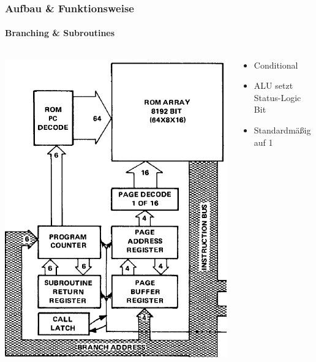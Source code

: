 \begin{frame}
\frametitle{Aufbau \& Funktionsweise}
 \framesubtitle{Branching \& Subroutines}
 		 \begin{columns}
      \begin{column}{5cm}
    		\includegraphics[scale=0.3]{images/ROM.PNG}
      \end{column}
      \begin{column}{5cm}
        	\begin{itemize}
 						\item Conditional \pause
 						\item ALU setzt Status-Logic Bit \pause
 						\item Standardm{\"a}{\ss}ig auf 1
 					\end{itemize}
      \end{column}
     \end{columns}
\end{frame}


